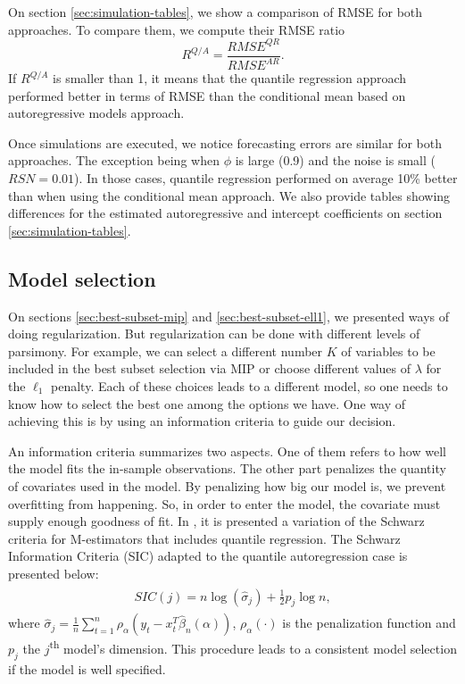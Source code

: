 On section \ref{sec:simulation-tables}, we show a comparison of RMSE for both approaches. To compare them, we compute their RMSE ratio
\begin{equation}
R^{Q/A} = \dfrac{RMSE^{QR}}{RMSE^{AR}}.
\end{equation}
If $R^{Q/A}$ is smaller than 1, it means that the quantile regression approach performed better in terms of RMSE than the conditional mean based on autoregressive models approach.

Once simulations are executed, we notice forecasting errors are similar for both approaches. The exception being when $\phi$ is large (0.9) and the noise is small ($RSN = 0.01$). In those cases, quantile regression performed on average 10\% better than when using the conditional mean approach.
We also provide tables showing differences for the estimated autoregressive and intercept coefficients on section \ref{sec:simulation-tables}.

\subsection{Model selection}

On sections \ref{sec:best-subset-mip} and \ref{sec:best-subset-ell1}, we presented ways of doing regularization. But regularization can be done with different levels of parsimony. For example, we can select a different number $K$ of variables to be included in the best subset selection via MIP or choose different values of $\lambda$ for the $\ell_1$ penalty. Each of these choices leads to a different model, so one needs to know how to select the best one among the options we have. One way of achieving this is by using an information criteria to guide our decision. 

An information criteria summarizes two aspects. One of them refers to how well the model fits the in-sample observations. The other part penalizes the quantity of covariates used in the model. By penalizing how big our model is, we prevent overfitting from happening. So, in order to enter the model, the covariate must supply enough goodness of fit.
In \cite{machado1993robust}, it is presented a variation of the Schwarz criteria for M-estimators that includes quantile regression. The Schwarz Information Criteria (SIC) adapted to the quantile autoregression case is presented below:
\begin{align} 
\begin{split}
SIC(j) = n \log(\hat{\sigma}_{j})+\frac{1}{2}p_{j}\log n,\label{eq:SIC}
\end{split}					
\end{align}
where $\hat{\sigma}_{j}= \frac{1}{n} \sum_{t=1}^{n} \rho_{\alpha}(y_{t}-x^{T}_{t}\hat{\beta}_{n}(\alpha))$, $\rho_\alpha(\cdot)$  is the penalization function and $p_{j}$ the $j$\textsuperscript{th} model's dimension. This procedure leads to a consistent model selection if the model is well specified. 


